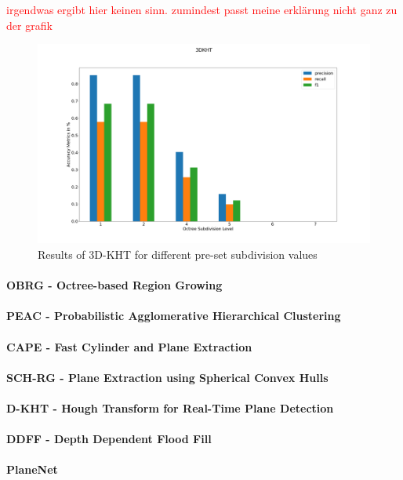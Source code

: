\documentclass[main.tex]{subfiles}
\begin{document}
\textcolor{red}{irgendwas ergibt hier keinen sinn. zumindest passt meine erklärung nicht ganz zu der grafik}

\begin{figure}[!ht]
    \centering
    \includegraphics[width=15 cm]{images/params_3dkht.png}
    \caption[3D-KHT Parameter Benchmark Results]{Results of 3D-KHT for different pre-set subdivision values}
    \label{fig:3dkht_params}
\end{figure}


\paragraph{OBRG - Octree-based Region Growing}
\paragraph{PEAC - Probabilistic Agglomerative Hierarchical Clustering}
\paragraph{CAPE - Fast Cylinder and Plane Extraction}
\paragraph{SCH-RG - Plane Extraction using Spherical Convex Hulls}
\paragraph{D-KHT - Hough Transform for Real-Time Plane Detection}
\paragraph{DDFF - Depth Dependent Flood Fill}
\paragraph{PlaneNet}
\end{document}
